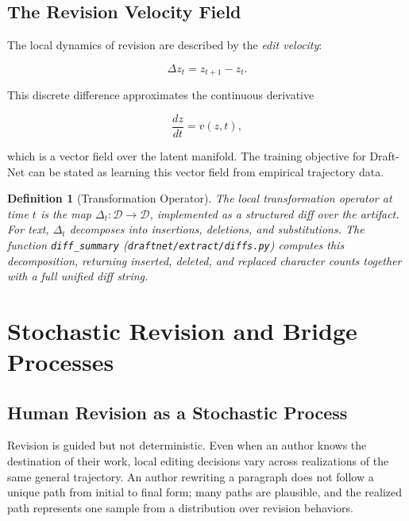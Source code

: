 \documentclass[12pt,a4paper]{article}
\theoremstyle{draftthm}
\newtheorem{definition}{Definition}[section]
\newcommand{\D}{\mathcal{D}}
\newcommand{\dz}{\Delta z}
\newcommand{\code}[1]{\texttt{\small #1}}
\begin{document}
\subsection{The Revision Velocity Field}

The local dynamics of revision are described by the \emph{edit velocity}:

\begin{equation}
  \dz_t = z_{t+1} - z_t.
\end{equation}

This discrete difference approximates the continuous derivative

\begin{equation}
  \frac{dz}{dt} = v(z, t),
\end{equation}

which is a vector field over the latent manifold. The training objective for Draft-Net can be stated as learning this vector field from empirical trajectory data.

\begin{definition}[Transformation Operator]
  The local \emph{transformation operator} at time $t$ is the map $\Delta_t: \D \to \D$, implemented as a structured diff over the artifact. For text, $\Delta_t$ decomposes into insertions, deletions, and substitutions. The function \code{diff\_summary} (\code{draftnet/extract/diffs.py}) computes this decomposition, returning inserted, deleted, and replaced character counts together with a full unified diff string.
\end{definition}

\section{Stochastic Revision and Bridge Processes}

\subsection{Human Revision as a Stochastic Process}

Revision is guided but not deterministic. Even when an author knows the destination of their work, local editing decisions vary across realizations of the same general trajectory. An author rewriting a paragraph does not follow a unique path from initial to final form; many paths are plausible, and the realized path represents one sample from a distribution over revision behaviors.
\end{document}
